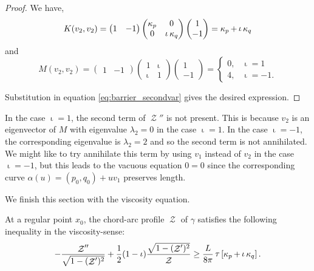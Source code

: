\documentclass[11pt]{amsart}
\DeclareMathOperator{\chordarcprofile}{\mathcal{Z}}
\DeclareMathOperator{\tangindicator}{\iota}
\DeclareMathOperator{\norindicator}{\tau}
\begin{document}
\begin{proof}
We have,
\[
K(v_2, v_2) =
\begin{pmatrix}
1 & -1
\end{pmatrix}
\begin{pmatrix}
\curvecurv_{p} & 0 \\
0 & \tangindicator \curvecurv_{q}
\end{pmatrix}
\begin{pmatrix}
1 \\
-1
\end{pmatrix}
= \curvecurv_p + \tangindicator \curvecurv_q
\]
and
\[
M(v_2, v_2) = \begin{pmatrix}
1 & -1
\end{pmatrix}
\begin{pmatrix}
1 & \tangindicator \\
\tangindicator & 1
\end{pmatrix}
\begin{pmatrix}
1 \\
-1
\end{pmatrix}
= \begin{cases}
0, & \tangindicator = 1 \\
4, & \tangindicator = -1.
\end{cases}
\]

Substitution in equation \eqref{eq:barrier_secondvar} gives the desired expression.
\end{proof}

\begin{remark}
In the case \(\tangindicator = 1\), the second term of \(\chordarcprofile''\) is not present. This is because \(v_2\) is an eigenvector of \(M\) with eigenvalue \(\lambda_2 = 0\) in the case \(\tangindicator = 1\). In the case \(\tangindicator = -1\), the corresponding eigenvalue is \(\lambda_2 = 2\) and so the second term is not annihilated. We might like to try annihilate this term by using \(v_1\) instead of \(v_2\) in the case \(\tangindicator = -1\), but this leads to the vacuous equation \(0 = 0\) since the corresponding curve \(\alpha(u) = (p_0, q_0) + u v_1\) preserves length.
\end{remark}

We finish this section with the viscosity equation.

\begin{theorem}
\label{thm:spatial_viscosity}
At a regular point \(x_0\), the chord-arc profile $\chordarcprofile$ of \(\gamma\) satisfies the following inequality in the viscosity-sense:
\[
-\frac{\chordarcprofile''}{\sqrt{1-(\chordarcprofile')^2}} + \frac{1}{2} (1-\tangindicator) \frac{\sqrt{1 - (\chordarcprofile')^2}}{\chordarcprofile} \geq \frac{L}{8\pi} \norindicator \left[\curvecurv_p + \tangindicator \curvecurv_q\right].
\]
\end{theorem}
\end{document}
